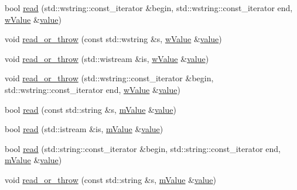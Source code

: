 \begin{DoxyCompactItemize}
\item 
bool \hyperlink{namespacejson__spirit_ad6621b74ba6446cfda2a18fd1e8aaea4}{read} (std\+::wstring\+::const\+\_\+iterator \&begin, std\+::wstring\+::const\+\_\+iterator end, \hyperlink{namespacejson__spirit_a048cde4e921b6f41cbc0fab1cbc352e8}{w\+Value} \&\hyperlink{cache_8cc_a0f61d63b009d0880a89c843bd50d8d76}{value})
\item 
void \hyperlink{namespacejson__spirit_ae08a5a85ec667e48c9600f13feceda76}{read\+\_\+or\+\_\+throw} (const std\+::wstring \&s, \hyperlink{namespacejson__spirit_a048cde4e921b6f41cbc0fab1cbc352e8}{w\+Value} \&\hyperlink{cache_8cc_a0f61d63b009d0880a89c843bd50d8d76}{value})
\item 
void \hyperlink{namespacejson__spirit_a398a27db2887002e93564f3ab06b25e3}{read\+\_\+or\+\_\+throw} (std\+::wistream \&is, \hyperlink{namespacejson__spirit_a048cde4e921b6f41cbc0fab1cbc352e8}{w\+Value} \&\hyperlink{cache_8cc_a0f61d63b009d0880a89c843bd50d8d76}{value})
\item 
void \hyperlink{namespacejson__spirit_ac360d2265e5ac8a0263b7961dc2ea589}{read\+\_\+or\+\_\+throw} (std\+::wstring\+::const\+\_\+iterator \&begin, std\+::wstring\+::const\+\_\+iterator end, \hyperlink{namespacejson__spirit_a048cde4e921b6f41cbc0fab1cbc352e8}{w\+Value} \&\hyperlink{cache_8cc_a0f61d63b009d0880a89c843bd50d8d76}{value})
\item 
bool \hyperlink{namespacejson__spirit_a5c5dbf8b42bd01e1bc8b6ee7f6653927}{read} (const std\+::string \&s, \hyperlink{namespacejson__spirit_a4dfd55710919c7c5e20fcbe4e4fe7b46}{m\+Value} \&\hyperlink{cache_8cc_a0f61d63b009d0880a89c843bd50d8d76}{value})
\item 
bool \hyperlink{namespacejson__spirit_a3be801f0f291800560a2104c66598cde}{read} (std\+::istream \&is, \hyperlink{namespacejson__spirit_a4dfd55710919c7c5e20fcbe4e4fe7b46}{m\+Value} \&\hyperlink{cache_8cc_a0f61d63b009d0880a89c843bd50d8d76}{value})
\item 
bool \hyperlink{namespacejson__spirit_a80aa651af7d7b496a18f80fe591267c0}{read} (std\+::string\+::const\+\_\+iterator \&begin, std\+::string\+::const\+\_\+iterator end, \hyperlink{namespacejson__spirit_a4dfd55710919c7c5e20fcbe4e4fe7b46}{m\+Value} \&\hyperlink{cache_8cc_a0f61d63b009d0880a89c843bd50d8d76}{value})
\item 
void \hyperlink{namespacejson__spirit_a6795e273fb7304a083bcb6ad8430cf85}{read\+\_\+or\+\_\+throw} (const std\+::string \&s, \hyperlink{namespacejson__spirit_a4dfd55710919c7c5e20fcbe4e4fe7b46}{m\+Value} \&\hyperlink{cache_8cc_a0f61d63b009d0880a89c843bd50d8d76}{value})

\end{DoxyCompactItemize}
